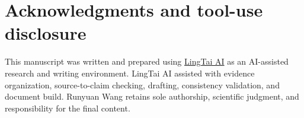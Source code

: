 \documentclass[11pt]{article}
\begin{document}
\section*{Acknowledgments and tool-use disclosure}

This manuscript was written and prepared using \href{https://github.com/Lingtai-AI/lingtai}{LingTai AI} as an AI-assisted research and writing environment. LingTai AI assisted with evidence organization, source-to-claim checking, drafting, consistency validation, and document build. Runyuan Wang retains sole authorship, scientific judgment, and responsibility for the final content.



\end{document}
